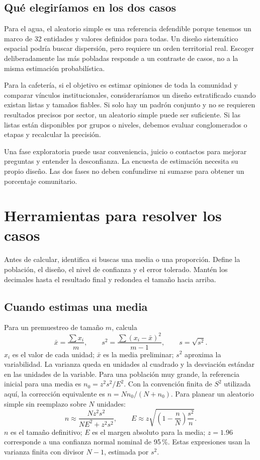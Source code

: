 \documentclass[11pt,letterpaper]{article}
\begin{document}
\subsection{Qué elegiríamos en los dos casos}
Para el agua, el aleatorio simple es una referencia defendible porque tenemos un marco de 32 entidades y valores definidos para todas. Un diseño sistemático espacial podría buscar dispersión, pero requiere un orden territorial real. Escoger deliberadamente las más pobladas responde a un contraste de casos, no a la misma estimación probabilística.

Para la cafetería, si el objetivo es estimar opiniones de toda la comunidad y comparar vínculos institucionales, consideraríamos un diseño estratificado cuando existan listas y tamaños fiables. Si solo hay un padrón conjunto y no se requieren resultados precisos por sector, un aleatorio simple puede ser suficiente. Si las listas están disponibles por grupos o niveles, debemos evaluar conglomerados o etapas y recalcular la precisión.

Una fase exploratoria puede usar conveniencia, juicio o contactos para mejorar preguntas y entender la desconfianza. La encuesta de estimación necesita su propio diseño. Las dos fases no deben confundirse ni sumarse para obtener un porcentaje comunitario.
\clearpage
\section{Herramientas para resolver los casos}
Antes de calcular, identifica si buscas una media o una proporción. Define la población, el diseño, el nivel de confianza y el error tolerado. Mantén los decimales hasta el resultado final y redondea el tamaño hacia arriba.
\subsection{Cuando estimas una media}
Para un premuestreo de tamaño $m$, calcula
\[\bar{x}=\frac{\sum x_i}{m},\qquad s^2=\frac{\sum(x_i-\bar{x})^2}{m-1},\qquad s=\sqrt{s^2}.\]
$x_i$ es el valor de cada unidad; $\bar{x}$ es la media preliminar; $s^2$ aproxima la variabilidad. La varianza queda en unidades al cuadrado y la desviación estándar en las unidades de la variable.
Para una población muy grande, la referencia inicial para una media es $n_0=z^2s^2/E^2$. Con la convención finita de $S^2$ utilizada aquí, la corrección equivalente es $n=Nn_0/(N+n_0)$. Para planear un aleatorio simple sin reemplazo sobre $N$ unidades:
\[n\approx\frac{Nz^2s^2}{NE^2+z^2s^2},\qquad
E\approx z\sqrt{\left(1-\frac nN\right)\frac{s^2}{n}}.\]
$n$ es el tamaño definitivo; $E$ es el margen absoluto para la media; $z=1.96$ corresponde a una confianza normal nominal de 95\,\%. Estas expresiones usan la varianza finita con divisor $N-1$, estimada por $s^2$.
\end{document}
